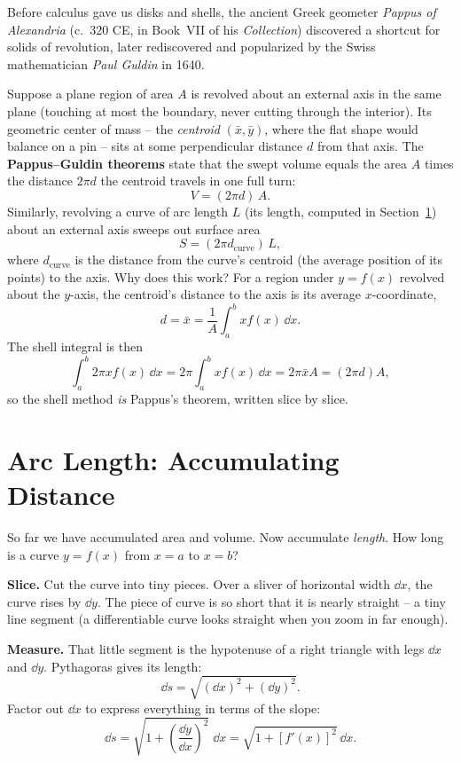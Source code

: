 \begin{connectionbox}
Before calculus gave us disks and shells, the ancient Greek geometer \emph{Pappus of Alexandria}
(c.~320 CE, in Book~VII of his \emph{Collection}) discovered a shortcut for solids
of revolution, later rediscovered and popularized by the Swiss mathematician \emph{Paul Guldin} in 1640.

Suppose a plane region of area $A$ is revolved
about an external axis in the same plane (touching at most the boundary,
never cutting through the interior). Its geometric center of mass -- the \emph{centroid}
$(\bar{x},\bar{y})$, where the flat shape would balance on a pin -- sits at
some perpendicular distance $d$ from that axis. The \textbf{Pappus--Guldin
theorems} state that the swept volume equals the area $A$ times the distance
$2\pi d$ the centroid travels in one full turn:
\[
  V = (2\pi d)\,A.
\]
Similarly, revolving a curve of arc length $L$ (its length, computed in
Section~\ref{ch26:arclength}) about an external axis sweeps out surface area
\[
  S = (2\pi d_{\text{curve}})\,L,
\]
where $d_{\text{curve}}$ is the distance from the curve's centroid (the average
position of its points) to the axis.
Why does this work? For a region under $y=f(x)$ revolved about the $y$-axis, the
centroid's distance to the axis is its average $x$-coordinate,
\[
  d = \bar{x} = \frac{1}{A}\int_a^b x f(x)\,\dd x .
\]
The shell integral is then
\[
  \int_a^b 2\pi x f(x)\,\dd x = 2\pi\int_a^b x f(x)\,\dd x = 2\pi\bar{x}A = (2\pi d)A,
\]
so the shell method \emph{is} Pappus's theorem, written slice by slice.
\end{connectionbox}

\section{Arc Length: Accumulating Distance}
\label{ch26:arclength}

So far we have accumulated area and volume. Now accumulate \emph{length}. How long
is a curve $y=f(x)$ from $x=a$ to $x=b$?

\textbf{Slice.} Cut the curve into tiny pieces. Over a sliver of horizontal width
$\dd x$, the curve rises by $\dd y$. The piece of curve is so short that it is
nearly straight -- a tiny line segment (a differentiable curve looks straight
when you zoom in far enough).

\textbf{Measure.} That little segment is the hypotenuse of a right triangle with
legs $\dd x$ and $\dd y$. Pythagoras gives its length:
\[
  \dd s = \sqrt{(\dd x)^2 + (\dd y)^2}.
\]
Factor out $\dd x$ to express everything in terms of the slope:
\[
  \dd s = \sqrt{1 + \left(\frac{\dd y}{\dd x}\right)^2}\;\dd x
        = \sqrt{1 + [f'(x)]^2}\,\dd x.
\]

